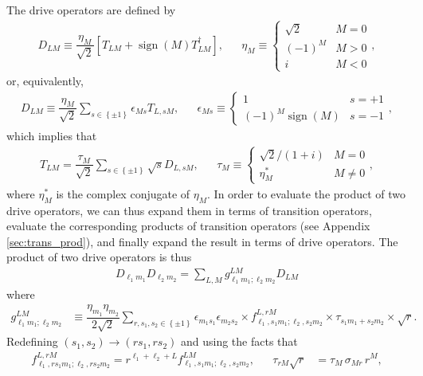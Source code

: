 \documentclass[nofootinbib,notitlepage,11pt]{revtex4-2}
\newcommand{\f}[2]{\dfrac{#1}{#2}} %
\newcommand{\p}[1]{\left(#1\right)} %
\renewcommand{\sp}[1]{\left[#1\right]} %
\renewcommand{\set}[1]{\left\{#1\right\}} %
\newcommand{\1}{\mathds{1}}
\DeclareMathOperator{\sign}{sign}
\begin{document}
The drive operators are defined by
\begin{align}
  D_{LM} \equiv \f{\eta_M}{\sqrt{2}}
  \sp{T_{LM} + \sign\p{M} T_{LM}^\dag},
  &&
  \eta_M \equiv
  \begin{cases}
    \sqrt{2} & M = 0 \\
    \p{-1}^M & M > 0 \\
    i & M < 0
  \end{cases},
\end{align}
or, equivalently,
\begin{align}
  D_{LM} \equiv \f{\eta_M}{\sqrt{2}}
  \sum_{s\in\set{\pm1}} \epsilon_{Ms} T_{L,sM},
  &&
  \epsilon_{Ms} \equiv
  \begin{cases}
    1 & s = +1 \\
    \p{-1}^M \sign\p{M} & s = -1
  \end{cases},
\end{align}
which implies that
\begin{align}
  T_{LM} = \f{\tau_M}{\sqrt{2}}
  \sum_{s\in\set{\pm1}} \sqrt{s} D_{L,sM},
  &&
  \tau_M \equiv
  \begin{cases}
    \sqrt{2}/\p{1+i} & M = 0 \\
    \eta_M^* & M \ne 0
  \end{cases},
\end{align}
where $\eta_M^*$ is the complex conjugate of $\eta_M$.  In order to
evaluate the product of two drive operators, we can thus expand them
in terms of transition operators, evaluate the corresponding products
of transition operators (see Appendix \ref{sec:trans_prod}), and
finally expand the result in terms of drive operators.  The product of
two drive operators is thus
\begin{align}
  D_{\ell_1 m_1} D_{\ell_2 m_2}
  = \sum_{L,M} g_{\ell_1m_1;\ell_2m_2}^{LM} D_{LM}
  \label{eq:drive_prod}
\end{align}
where
\begin{align}
  g_{\ell_1m_1;\ell_2m_2}^{LM}
  &\equiv \f{\eta_{m_1}\eta_{m_2}}{2\sqrt2}
  \sum_{r,s_1,s_2\in\set{\pm1}} \epsilon_{m_1s_1} \epsilon_{m_2s_2}
  \times f_{\ell_1,s_1m_1;\ell_2,s_2m_2}^{L,rM}
  \times \tau_{s_1m_1+s_2m_2} \times \sqrt{r}.
\end{align}
Redefining $\p{s_1,s_2}\to\p{rs_1,rs_2}$ and using the facts that
\begin{align}
  f_{\ell_1,rs_1m_1;\ell_2,rs_2m_2}^{L,rM}
  = r^{\ell_1+\ell_2+L} f_{\ell_1,s_1m_1;\ell_2,s_2m_2}^{LM},
  &&
  \tau_{rM} \sqrt{r} &= \tau_M \, \sigma_{Mr} \, r^M,
\end{align}
\end{document}
